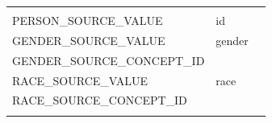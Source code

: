 \documentclass[11pt]{book}
\theoremstyle{definition}
\theoremstyle{definition}
\theoremstyle{definition}
\theoremstyle{remark}
\begin{document}
\begin{longtable}[]{@{}lll@{}}
\begin{minipage}[t]{0.51\columnwidth}
\strut
\end{minipage}\tabularnewline
\begin{minipage}[t]{0.28\columnwidth}\raggedright
PERSON\_SOURCE\_VALUE\strut
\end{minipage} & \begin{minipage}[t]{0.12\columnwidth}\raggedright
id\strut
\end{minipage} & \begin{minipage}[t]{0.51\columnwidth}\raggedright
\strut
\end{minipage}\tabularnewline
\begin{minipage}[t]{0.28\columnwidth}\raggedright
GENDER\_SOURCE\_VALUE\strut
\end{minipage} & \begin{minipage}[t]{0.12\columnwidth}\raggedright
gender\strut
\end{minipage} & \begin{minipage}[t]{0.51\columnwidth}\raggedright
\strut
\end{minipage}\tabularnewline
\begin{minipage}[t]{0.28\columnwidth}\raggedright
GENDER\_SOURCE\_CONCEPT\_ID\strut
\end{minipage} & \begin{minipage}[t]{0.12\columnwidth}\raggedright
\strut
\end{minipage} & \begin{minipage}[t]{0.51\columnwidth}\raggedright
\strut
\end{minipage}\tabularnewline
\begin{minipage}[t]{0.28\columnwidth}\raggedright
RACE\_SOURCE\_VALUE\strut
\end{minipage} & \begin{minipage}[t]{0.12\columnwidth}\raggedright
race\strut
\end{minipage} & \begin{minipage}[t]{0.51\columnwidth}\raggedright
\strut
\end{minipage}\tabularnewline
\begin{minipage}[t]{0.28\columnwidth}\raggedright
RACE\_SOURCE\_CONCEPT\_ID\strut
\end{minipage} & \begin{minipage}[t]{0.12\columnwidth}\raggedright
\strut
\end{minipage} & \begin{minipage}[t]{0.51\columnwidth}\raggedright
\strut
\end{minipage}\tabularnewline
\begin{minipage}[t]{0.28\columnwidth}\raggedright

\end{minipage}
\end{longtable}
\end{document}
